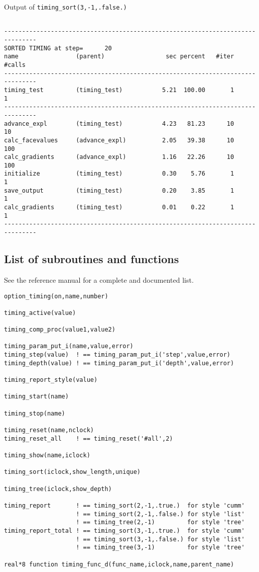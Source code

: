 \begin{table}
\caption{Output of {\tt timing\_sort(3,-1,.false.)}}
{\footnotesize
\begin{verbatim}

-------------------------------------------------------------------------------
SORTED TIMING at step=      20
name                (parent)                 sec percent   #iter  #calls
-------------------------------------------------------------------------------
timing_test         (timing_test)           5.21  100.00       1       1
-------------------------------------------------------------------------------
advance_expl        (timing_test)           4.23   81.23      10      10
calc_facevalues     (advance_expl)          2.05   39.38      10     100
calc_gradients      (advance_expl)          1.16   22.26      10     100
initialize          (timing_test)           0.30    5.76       1       1
save_output         (timing_test)           0.20    3.85       1       1
calc_gradients      (timing_test)           0.01    0.22       1       1
-------------------------------------------------------------------------------

\end{verbatim}
}
\label{t-timinglist3}
\end{table}

\newpage
\subsection{List of subroutines and functions}

See the reference manual for a complete and documented list.
\begin{verbatim}
option_timing(on,name,number)

timing_active(value)

timing_comp_proc(value1,value2)

timing_param_put_i(name,value,error)
timing_step(value)  ! == timing_param_put_i('step',value,error)
timing_depth(value) ! == timing_param_put_i('depth',value,error)

timing_report_style(value)

timing_start(name)

timing_stop(name)

timing_reset(name,nclock)
timing_reset_all    ! == timing_reset('#all',2)

timing_show(name,iclock)

timing_sort(iclock,show_length,unique)

timing_tree(iclock,show_depth)

timing_report       ! == timing_sort(2,-1,.true.)  for style 'cumm'
                    ! == timing_sort(2,-1,.false.) for style 'list'
                    ! == timing_tree(2,-1)         for style 'tree'
timing_report_total ! == timing_sort(3,-1,.true.)  for style 'cumm'
                    ! == timing_sort(3,-1,.false.) for style 'list'
                    ! == timing_tree(3,-1)         for style 'tree'

real*8 function timing_func_d(func_name,iclock,name,parent_name)
\end{verbatim}

